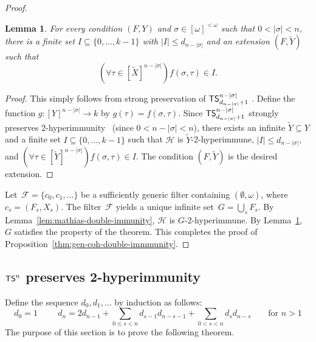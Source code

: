 \documentclass{amsart}
\newtheorem{lemma}[theorem]{Lemma}
\theoremstyle{definition}
\theoremstyle{remark}
\numberwithin{equation}{section}
\theoremstyle{noparens}
\def\t{\tilde}
\def\propertyL{2-hyperimmunity}
\def\hyper{2-hyperimmune}
\newcommand{\Fcal}{\mathcal{F}}
\newcommand{\Hcal}{\mathcal{H}}
\newcommand{\p}[1]{\left( #1 \right)}
\newcommand{\card}[1]{\left| #1 \right|}
\newcommand{\s}[1]{\ensuremath{\sf{#1}}}
\DeclareMathOperator{\ts}{\s{TS}}
\begin{document}
\begin{proof}
\begin{lemma}\label{lem:gen-coh-function}
For every condition $(F, Y)$ and $\sigma \in [\omega]^{<\omega}$ such that $0< \card{\sigma} < n$,
there is a finite set $I \subseteq \{0, \dots, k-1\}$ with $|I| \leq d_{n-|\sigma|}$
and an extension $(F, \t Y)$ such that
$$
(\forall \tau \in [\tilde{X}]^{n-|\sigma|})f(\sigma, \tau) \in I.
$$
\end{lemma}
\begin{proof}
This simply follows from strong preservation of $\ts^{n - |\sigma|}_{d_{n-|\sigma|}+1}$ .
Define the function $g : [Y]^{n - |\sigma|} \to k$ by $g(\tau) = f(\sigma, \tau)$.
Since  $\ts^{n - |\sigma|}_{d_{n-|\sigma|}+1}$ strongly preserves \propertyL
\ (since $0<n-|\sigma|<n$),
there exists an infinite  $\t Y\subseteq Y$ and a finite set $I \subseteq \{0, \dots, k-1\}$
such that $\Hcal$ is $  \tilde{Y}$-\hyper, $|I| \leq d_{n-|\sigma|}$,
and $(\forall \tau \in [\tilde{Y}]^{n-|\sigma|})f(\sigma, \tau) \in I$.
The condition $(F, \tilde{Y})$ is the desired extension.
\end{proof}

Let~$\Fcal = \{c_0, c_1, \dots\}$ be a sufficiently generic filter containing $(\emptyset, \omega)$,
where $c_s = (F_s, X_s)$. The filter~$\Fcal$ yields a unique infinite set~$G = \bigcup_s F_s$.
By Lemma~\ref{lem:mathias-double-immunity}, $\Hcal$ is $  G$-\hyper.
By Lemma~\ref{lem:gen-coh-function}, $G$ satisfies the property of the theorem.
This completes the proof of Proposition~\ref{thm:gen-coh-double-immmunity}.
\end{proof}

\subsection{$\ts^n$ preserves \propertyL}\label{subsect:tsn-preserves}
\def\p{2d_{n-1}+\sum_{0\leq s<n}d_{s-1}d_{n-s-1}}
Define the sequence $d_0, d_1, \dots$ by induction as follows:
$$
d_0 = 1 \hspace{1cm} d_{n} = \p+\sum_{0 < s < n} d_s d_{n-s} \hspace{20pt} \mbox{ for } n > 1
$$
The purpose of this section is to prove the following theorem.
\end{document}
